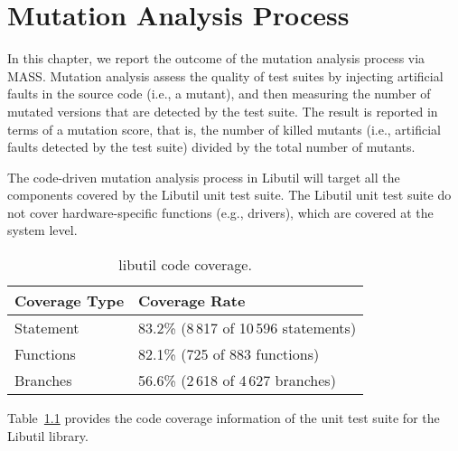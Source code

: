 
\chapter{Mutation Analysis Process}
\label{mass_output}



In this chapter, we report the outcome of the mutation analysis process via MASS. Mutation analysis assess the quality of test suites by injecting artificial faults in the source code (i.e., a mutant), and then measuring the number of mutated versions that are detected by the test suite. The result is reported in terms of a mutation score, that is, the number of killed mutants (i.e., artificial faults detected by the test suite) divided by the total number of mutants.


The code-driven mutation analysis process in Libutil will target all the components covered by the Libutil unit test suite. 
The Libutil unit test suite do not cover hardware-specific functions (e.g., drivers), which are covered at the system level.

\begin{table}[h]
\centering
\begin{tabular}{|l|l|}
\hline
\textbf{Coverage Type} & \textbf{Coverage Rate} \\
\hline
Statement     & 83.2\% (8\,817 of 10\,596 statements)\\
Functions     & 82.1\% (725 of 883 functions)\\
Branches      & 56.6\% (2\,618 of 4\,627 branches)\\
\hline
\end{tabular}
\caption{libutil code coverage.}
\label{table:gslibutil_coverage}
\end{table}

Table~\ref{table:gslibutil_coverage} provides the code coverage information of the unit test suite for the Libutil library. 


